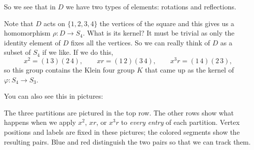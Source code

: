 \documentclass[reqno,11pt]{amsart}
\begin{document}
\medskip

So we see that in $D$ we have two types of elements: rotations and reflections.

Note that $D$ acts on $\{ 1, 2, 3, 4\}$ the vertices of the square and this gives us a homomorphism $\rho: D \rightarrow S_4$. What is its kernel? It must be trivial as only the identity element of $D$ fixes all the vertices. So we can really think of $D$ as a subset of $S_4$ if we like.
If we do this,
\[
  x^2=(1\,3)(2\,4),\qquad xr=(1\,2)(3\,4),\qquad
  x^3r=(1\,4)(2\,3),
\]
so this group contains the Klein four group $K$ that came up as the kernel of $\varphi: S_4 \rightarrow S_3.$

You can also see this in pictures:

The three partitions are pictured in the top row. The other rows show
what happens when we apply $x^2$, $xr$, or $x^3r$ to \emph{every entry}
of each partition. Vertex positions and labels are fixed in these
pictures; the colored segments show the resulting pairs.
Blue and red distinguish the two pairs so that we can track them.
\end{document}
